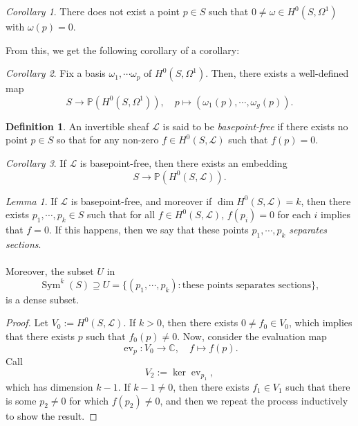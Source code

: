\documentclass[a4paper]{report}
\theoremstyle{definition}
\newtheorem{definition}{Definition}
\theoremstyle{remark}
\theoremstyle{proposition}
\theoremstyle{conjecture}
\theoremstyle{lemma}
\newtheorem{lemma}{Lemma}
\theoremstyle{corollary}
\newtheorem{corollary}{Corollary}
\theoremstyle{exercise}
\theoremstyle{example}
\newcommand{\C}{\mathbb{C}}
\newcommand{\mcal}{\mathcal}
\newcommand{\on}{\operatorname}
\begin{document}
\begin{corollary}
    There does not exist a point $p\in S$ such that $0\neq \omega \in H^0(S,\Omega^1)$ with $\omega(p) = 0$.
\end{corollary}

From this, we get the following corollary of a corollary:

\begin{corollary}
    Fix a basis $\omega_1,\cdots\omega_p$ of $H^0(S,\Omega^1)$.
    Then, there exists a well-defined map 
    $$S \longrightarrow \mathbb{P}(H^0(S,\Omega^1)),\quad p\longmapsto (\omega_1(p),\cdots,\omega_g(p)).$$
\end{corollary}

\begin{definition}
    An invertible sheaf $\mcal{L}$ is said to be \emph{basepoint-free}
    if there exists no point $p\in S$ so that for any non-zero
    $f \in H^0(S,\mcal{L})$ such that $f(p) = 0$.
\end{definition}

\begin{corollary}
    If $\mcal{L}$ is basepoint-free, then there exists an embedding
    $$S\longrightarrow \mathbb{P}(H^0(S,\mcal{L})).$$
\end{corollary}

\begin{lemma}
    If $\mcal{L}$ is basepoint-free, and moreover if 
    $\dim H^0(S,\mcal{L}) = k$, then there exists $p_1,\cdots,p_k \in S$ 
    such that for all $f \in H^0(S,\mcal{L})$, $f(p_i) = 0$ for each $i$
    implies that $f = 0$. If this happens, then we say that these 
    points $p_1,\cdots,p_k$ \emph{separates sections}.\\\\
    Moreover, the subset $U$ in $$\on{Sym}^k(S) \supseteq U = \lbrace (p_1,\cdots,p_k) : \text{these points separates sections}\rbrace,$$
    is a dense subset.
\end{lemma}

\begin{proof}
    Let $V_0 := H^0(S,\mcal{L})$. If $k > 0$, then there exists 
    $0\neq f_0 \in V_0$, which implies that there exists 
    $p$ such that $f_0(p) \neq 0$. Now, consider the evaluation map
    $$\on{ev}_p : V_0 \longrightarrow \C,\quad f\longmapsto f(p).$$
    Call $$V_2 := \ker\on{ev}_{p_1},$$
    which has dimension $k-1$. If $k-1 \neq 0$, then there exists 
    $f_1 \in V_1$ such that there is some $p_2 \neq 0$
    for which $f(p_2) \neq 0$, and then we repeat the process inductively
    to show the result.
\end{proof}
\end{document}

